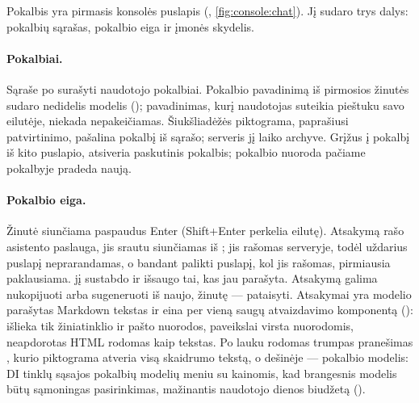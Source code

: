 Pokalbis yra pirmasis konsolės puslapis (, \cref{fig:console:chat}).
Jį sudaro trys dalys: pokalbių sąrašas, pokalbio eiga ir įmonės skydelis.

\paragraph{Pokalbiai.} Sąraše po  surašyti naudotojo pokalbiai. Pokalbio
pavadinimą iš pirmosios žinutės sudaro nedidelis modelis (); pavadinimas,
kurį naudotojas suteikia pieštuku savo eilutėje, niekada nepakeičiamas. Šiukšliadėžės piktograma,
paprašiusi patvirtinimo, pašalina pokalbį iš sąrašo; serveris jį laiko archyve. Grįžus į
pokalbį iš kito puslapio, atsiveria paskutinis pokalbis; pokalbio nuoroda pačiame pokalbyje
pradeda naują.

\paragraph{Pokalbio eiga.} Žinutė siunčiama paspaudus Enter (Shift+Enter perkelia eilutę).
Atsakymą rašo asistento paslauga, jis srautu siunčiamas iš ;
jis rašomas serveryje, todėl uždarius puslapį neprarandamas, o bandant palikti puslapį, kol jis
rašomas, pirmiausia paklausiama.  jį sustabdo ir išsaugo tai, kas jau
parašyta. Atsakymą galima nukopijuoti arba sugeneruoti iš naujo, žinutę --- pataisyti.
Atsakymai yra modelio parašytas Markdown tekstas ir eina per vieną saugų atvaizdavimo komponentą
(): išlieka tik žiniatinklio ir pašto nuorodos,
paveikslai virsta nuorodomis, neapdorotas HTML rodomas kaip tekstas.
Po lauku rodomas trumpas pranešimas , kurio piktograma atveria visą skaidrumo
tekstą, o dešinėje --- pokalbio modelis: DI tinklų sąsajos pokalbių modelių meniu su kainomis,
kad brangesnis modelis būtų sąmoningas pasirinkimas, mažinantis naudotojo dienos biudžetą
().

